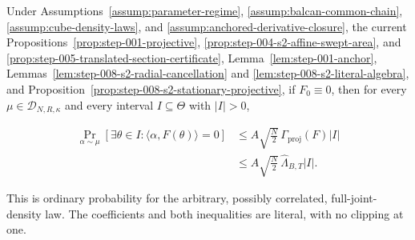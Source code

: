\begin{proposition}
\label{prop:step-008-s2-pairwise-homogeneous-rate}

Under Assumptions~\ref{assump:parameter-regime}, \ref{assump:balcan-common-chain},
\ref{assump:cube-density-laws}, and \ref{assump:anchored-derivative-closure}, the current
Propositions~\ref{prop:step-001-projective},
\ref{prop:step-004-s2-affine-swept-area}, and
\ref{prop:step-005-translated-section-certificate}, Lemma~\ref{lem:step-001-anchor}, Lemmas~\ref{lem:step-008-s2-radial-cancellation} and
\ref{lem:step-008-s2-literal-algebra}, and
Proposition~\ref{prop:step-008-s2-stationary-projective}, if \(F_0\equiv0\), then for every
\(\mu\in\mathcal D_{N,R,\kappa}\) and every interval \(I\subseteq\Theta\) with
\(\lvert I\rvert>0\),

\begin{equation}
\label{eq:appendix-display-232}
\begin{aligned}
\Pr_{\alpha\sim\mu}
[\exists\theta\in I:\langle\alpha,F(\theta)\rangle=0]
&\leq
A\sqrt{\frac N2}\,
\Gamma_{\mathrm{proj}}(F)\lvert I\rvert\\
&\leq
A\sqrt{\frac N2}\,
\widehat\Lambda_{B,T}\lvert I\rvert.
\end{aligned}
\end{equation}

This is ordinary probability for the arbitrary, possibly correlated, full-joint-density law. The coefficients
and both inequalities are literal, with no clipping at one.


\end{proposition}

